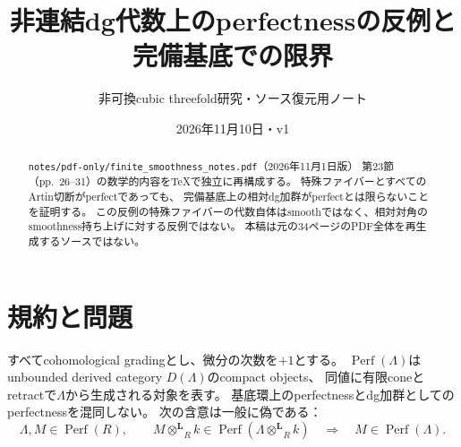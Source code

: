 \documentclass[a4paper,11pt]{ltjsarticle}
\title{非連結dg代数上のperfectnessの反例と完備基底での限界}
\author{非可換cubic threefold研究・ソース復元用ノート}
\date{2026年11月10日・v1}
\newcommand{\Perf}{\operatorname{Perf}}
\newcommand{\otL}{\mathbin{\otimes^{\mathbf L}}}
\begin{document}
\maketitle
\begin{abstract}
\texttt{notes/pdf-only/finite\_smoothness\_notes.pdf}（2026年11月1日版）
第23節（pp.~26--31）の数学的内容をTeXで独立に再構成する。
特殊ファイバーとすべてのArtin切断がperfectであっても、
完備基底上の相対dg加群がperfectとは限らないことを証明する。
この反例の特殊ファイバーの代数自体はsmoothではなく、相対対角の
smoothness持ち上げに対する反例ではない。
本稿は元の34ページのPDF全体を再生成するソースではない。
\end{abstract}

\section{規約と問題}
すべてcohomological gradingとし、微分の次数を$+1$とする。
$\Perf(\Lambda)$はunbounded derived category $D(\Lambda)$のcompact objects、
同値に有限coneとretractで$\Lambda$から生成される対象を表す。
基底環上のperfectnessとdg加群としてのperfectnessを混同しない。
次の含意は一般に偽である：
\[
\Lambda,M\in\Perf(R),\qquad
M\otL_Rk\in\Perf(\Lambda\otL_Rk)
\quad\Longrightarrow\quad M\in\Perf(\Lambda).
\tag{DG4.1}
\]
\end{document}
